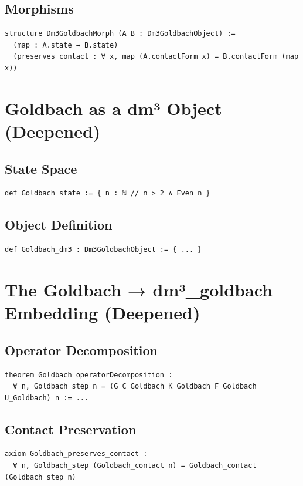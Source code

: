 \documentclass[11pt,a4paper]{article}
\begin{document}
\subsection{Morphisms}
\begin{lstlisting}
structure Dm3GoldbachMorph (A B : Dm3GoldbachObject) :=
  (map : A.state → B.state)
  (preserves_contact : ∀ x, map (A.contactForm x) = B.contactForm (map x))
\end{lstlisting}

\section{Goldbach as a dm³ Object (Deepened)}

\subsection{State Space}
\begin{lstlisting}
def Goldbach_state := { n : ℕ // n > 2 ∧ Even n }
\end{lstlisting}

\subsection{Object Definition}
\begin{lstlisting}
def Goldbach_dm3 : Dm3GoldbachObject := { ... }
\end{lstlisting}

\section{The Goldbach → dm³\_goldbach Embedding (Deepened)}

\subsection{Operator Decomposition}
\begin{lstlisting}
theorem Goldbach_operatorDecomposition :
  ∀ n, Goldbach_step n = (G C_Goldbach K_Goldbach F_Goldbach U_Goldbach) n := ...
\end{lstlisting}

\subsection{Contact Preservation}
\begin{lstlisting}
axiom Goldbach_preserves_contact :
  ∀ n, Goldbach_step (Goldbach_contact n) = Goldbach_contact (Goldbach_step n)
\end{lstlisting}
\end{document}
